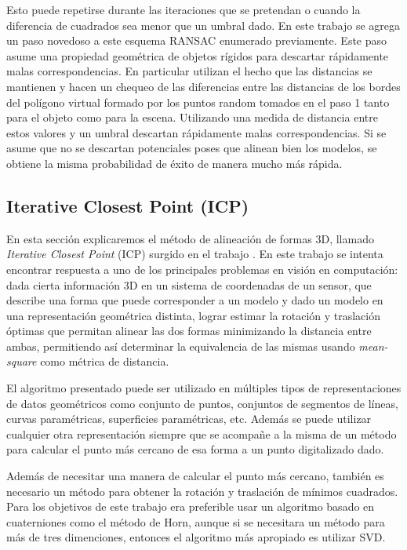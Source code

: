 Esto puede repetirse durante las iteraciones que se pretendan o cuando la diferencia de cuadrados sea menor que un umbral dado. En este trabajo se agrega un paso novedoso a este esquema RANSAC enumerado previamente. Este paso asume una propiedad geométrica de objetos rígidos para descartar rápidamente malas correspondencias. En particular utilizan el hecho que las distancias se mantienen y hacen un chequeo de las diferencias entre las distancias de los bordes del polígono virtual formado por los puntos random tomados en el paso 1 tanto para el objeto como para la escena. Utilizando una medida de distancia entre estos valores y un umbral descartan rápidamente malas correspondencias. Si se asume que no se descartan potenciales poses que alinean bien los modelos, se obtiene la misma probabilidad de éxito de manera mucho más rápida.


\subsection{Iterative Closest Point (ICP)}\label{ICP}
En esta sección explicaremos el método de alineación de formas 3D, llamado \textit{Iterative Closest Point} (ICP) surgido en el trabajo \cite{besl1992method}. En este trabajo se intenta encontrar respuesta a uno de los principales problemas en visión en computación: dada cierta información 3D en un sistema de coordenadas de un sensor, que describe una forma que puede corresponder a un modelo y dado un modelo en una representación geométrica distinta, lograr estimar la rotación y traslación óptimas que permitan alinear las dos formas minimizando la distancia entre ambas, permitiendo así determinar la equivalencia de las mismas usando \textit{mean-square} como métrica de distancia.

El algoritmo presentado puede ser utilizado en múltiples tipos de representaciones de datos geométricos como conjunto de puntos, conjuntos de segmentos de líneas, curvas paramétricas, superficies paramétricas, etc. Además se puede utilizar cualquier otra representación siempre que se acompañe a la misma de un método para calcular el punto más cercano de esa forma a un punto digitalizado dado.

Además de necesitar una manera de calcular el punto más cercano, también es necesario un método para obtener la rotación y traslación de mínimos cuadrados. Para los objetivos de este trabajo era preferible usar un algoritmo basado en cuaterniones como el método de Horn, aunque si se necesitara un método para más de tres dimenciones, entonces el algoritmo más apropiado es utilizar SVD.

